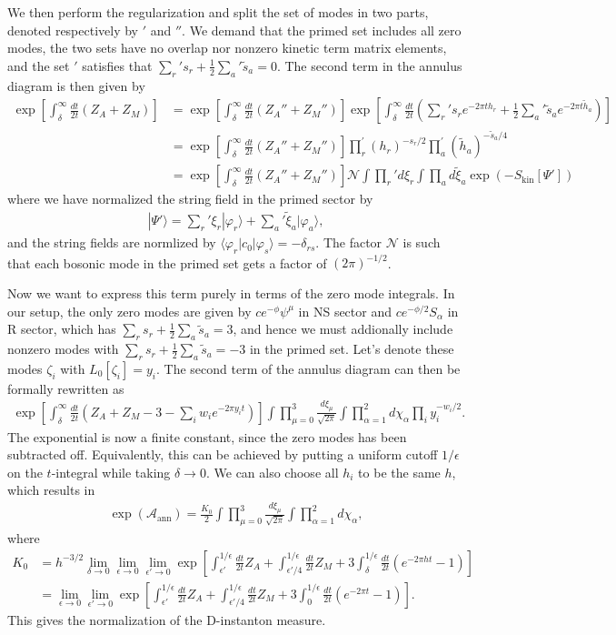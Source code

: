 \documentclass[12pt]{article}
\newcommand{\ie}{\begin{equation}\begin{aligned}}
\newcommand{\fe}{\end{aligned}\end{equation}}
\begin{document}
We then perform the regularization and split the set of modes in two parts, denoted respectively by $'$ and $''$. We demand that the primed set includes all zero modes, the two sets have no overlap nor nonzero kinetic term matrix elements, and the set $'$ satisfies that $\sum_r' s_r+\frac{1}{2}\sum_a'\tilde{s}_a=0$. The second term in the annulus diagram is then given by
\ie
\exp\left[\int_\delta^\infty \frac{dt}{2t}(Z_A+Z_M)\right]&=\exp\left[\int_\delta^\infty \frac{dt}{2t}(Z_A''+Z_M'')\right]\exp\left[\int_\delta^\infty \frac{dt}{2t}\left(\sum_r' s_r e^{-2\pi t h_r}+\frac{1}{2}\sum_a'\tilde{s}_a e^{-2\pi t \tilde{h}_a}\right)\right]\\
&=\exp\left[\int_\delta^\infty \frac{dt}{2t}(Z_A''+Z_M'')\right] \prod_r^{'}(h_r)^{-s_r/2}\prod_a^{'} (\tilde{h}_a)^{-\tilde{s}_a/4}\\
&=\exp\left[\int_\delta^\infty \frac{dt}{2t}(Z_A''+Z_M'')\right]\mathcal{N}\int \prod_r' d\xi_r \int \prod_a d\tilde{\xi}_a \exp(-S_\text{kin}[\Psi'])
\fe
where we have normalized the string field in the primed sector by
\ie
|\Psi'\rangle = \sum_r' \xi_r |\varphi_r\rangle + \sum_a' \tilde{\xi}_a |\varphi_a\rangle,
\fe
and the string fields are normlized by $\langle \varphi_r|c_0|\varphi_s\rangle = -\delta_{rs}$. The factor $\mathcal{N}$ is such that each bosonic mode in the primed set gets a factor of $(2\pi)^{-1/2}$.

Now we want to express this term purely in terms of the zero mode integrals. In our setup, the only zero modes are given by $ce^{-\phi}\psi^\mu$ in NS sector and $ce^{-\phi/2}S_\alpha$ in R sector, which has $\sum_r s_r + \frac{1}{2}\sum_a \tilde{s}_a = 3$, and hence we must addionally include nonzero modes with $\sum_r s_r + \frac{1}{2}\sum_a \tilde{s}_a =-3$ in the primed set. Let's denote these modes $\zeta_i$ with $L_0[\zeta_i]=y_i$. The second term of the annulus diagram can then be formally rewritten as
\ie
\exp\left[\int_\delta^\infty \frac{dt}{2t}\left(Z_A+Z_M-3-\sum_i w_i e^{-2\pi y_i t}\right)\right]\int \prod_{\mu = 0}^3 \frac{d\xi_\mu}{\sqrt{2\pi}} \int \prod_{\alpha = 1}^2 d\chi_\alpha \prod_i y_i^{-w_i/2}.
\fe
The exponential is now a finite constant, since the zero modes has been subtracted off. Equivalently, this can be achieved by putting a uniform cutoff $1/\epsilon$ on the $t$-integral while taking $\delta \rightarrow 0$. We can also choose all $h_i$ to be the same $h$, which results in
\ie
\exp\left(\mathcal{A}_\text{ann}\right)=\frac{K_0}{2} \int \prod_{\mu = 0}^3 \frac{d\xi_\mu}{\sqrt{2\pi}} \int \prod_{\alpha = 1}^2 d\chi_\alpha,
\fe
where
\ie \label{K0}
K_0 &= h^{-3/2}\lim_{\delta \rightarrow 0}\lim_{\epsilon \rightarrow 0}\lim_{\epsilon' \rightarrow 0} \exp\left[\int_{\epsilon'}^{1/\epsilon} \frac{dt}{2t}Z_A+\int_{\epsilon'/4}^{1/\epsilon} \frac{dt}{2t}Z_M+3\int_\delta^{1/\epsilon}\frac{dt}{2t}(e^{-2\pi h t}-1)\right]\\
&= \lim_{\epsilon \rightarrow 0}\lim_{\epsilon' \rightarrow 0} \exp\left[\int_{\epsilon'}^{1/\epsilon} \frac{dt}{2t}Z_A+\int_{\epsilon'/4}^{1/\epsilon} \frac{dt}{2t}Z_M+3\int_0^{1/\epsilon}\frac{dt}{2t}(e^{-2\pi t}-1)\right].
\fe
This gives the normalization of the D-instanton measure.
\end{document}

